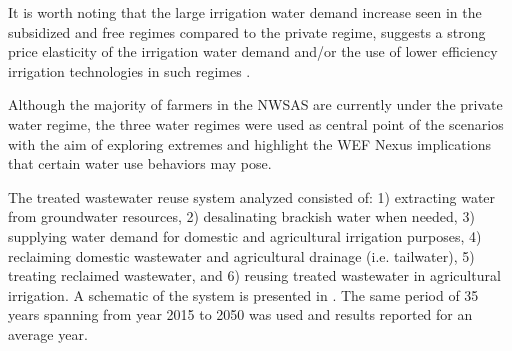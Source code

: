 It is worth noting that the large irrigation water demand increase seen in the subsidized and free regimes compared to the private regime, suggests a strong price elasticity of the irrigation water demand and/or the use of lower efficiency irrigation technologies in such regimes \cite{Socioeconomicaspectsirrigation2014}.

Although the majority of farmers in the NWSAS are currently under the private water regime, the three water regimes were used as central point of the scenarios with the aim of exploring extremes and highlight the WEF Nexus implications that certain water use behaviors may pose. 

The treated wastewater reuse system analyzed consisted of: 1) extracting water from groundwater resources, 2) desalinating brackish water when needed, 3) supplying water demand for domestic and agricultural irrigation purposes, 4) reclaiming domestic wastewater and agricultural drainage (i.e. tailwater), 5) treating reclaimed wastewater, and 6) reusing treated wastewater in agricultural irrigation. A schematic of the system is presented in . The same period of 35 years spanning from year 2015 to 2050 was used and results reported for an average year.


